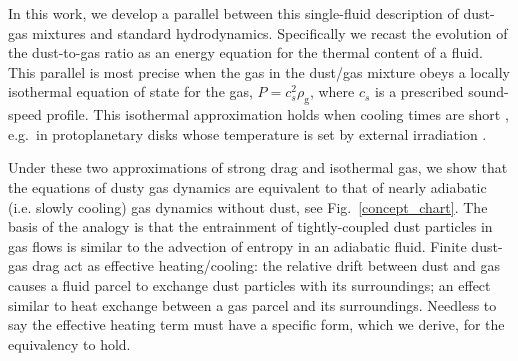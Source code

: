 \documentclass[iop, numberedappendix]{emulateapj}
\newcommand{\rhog}{\rho_\mathrm{g}}
\newcommand{\tstop}{t_\mathrm{s}}
\begin{document}

In this work, we develop a parallel between this single-fluid description of dust-gas mixtures and standard hydrodynamics.
Specifically we recast the evolution of the dust-to-gas ratio as an energy equation for the thermal content of a fluid.
This parallel is most precise when the gas in the dust/gas mixture obeys a locally isothermal equation of state for the gas, $P = c_s^2\rhog$, where $c_s$ is a prescribed sound-speed profile.   This isothermal approximation holds when cooling times are short \citep{lin15}, e.g.\ in protoplanetary disks 
 whose temperature is set by external irradiation
\citep{chiang97,stam08}. 



 

Under these two approximations of strong drag and isothermal gas, we show that the equations of 
 dusty gas dynamics are equivalent to that of nearly adiabatic (i.e. slowly cooling) gas
dynamics without dust, see Fig.~\ref{concept_chart}.  The basis of the analogy is that the entrainment 
of tightly-coupled dust particles in gas flows is similar to the advection
of entropy in an adiabatic fluid. %
Finite dust-gas drag act as effective heating/cooling: the relative
drift between dust and gas causes a fluid parcel to exchange dust
particles with its surroundings; an effect similar to heat exchange
between a gas parcel and its surroundings.   Needless to say the effective heating term must have a 
specific form, which we derive, for the equivalency to hold.
\end{document}

